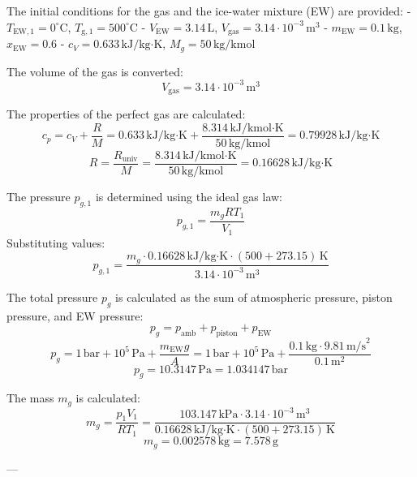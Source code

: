 The initial conditions for the gas and the ice-water mixture (EW) are provided:  
- \( T_{\text{EW},1} = 0^\circ\text{C} \), \( T_{\text{g},1} = 500^\circ\text{C} \)  
- \( V_{\text{EW}} = 3.14 \, \text{L} \), \( V_{\text{gas}} = 3.14 \cdot 10^{-3} \, \text{m}^3 \)  
- \( m_{\text{EW}} = 0.1 \, \text{kg} \), \( x_{\text{EW}} = 0.6 \)  
- \( c_V = 0.633 \, \text{kJ/kg·K} \), \( M_g = 50 \, \text{kg/kmol} \)  

The volume of the gas is converted:  
\[
V_{\text{gas}} = 3.14 \cdot 10^{-3} \, \text{m}^3
\]

The properties of the perfect gas are calculated:  
\[
c_p = c_V + \frac{R}{M} = 0.633 \, \text{kJ/kg·K} + \frac{8.314 \, \text{kJ/kmol·K}}{50 \, \text{kg/kmol}} = 0.79928 \, \text{kJ/kg·K}
\]  
\[
R = \frac{R_{\text{univ}}}{M} = \frac{8.314 \, \text{kJ/kmol·K}}{50 \, \text{kg/kmol}} = 0.16628 \, \text{kJ/kg·K}
\]

The pressure \( p_{g,1} \) is determined using the ideal gas law:  
\[
p_{g,1} = \frac{m_g R T_1}{V_1}
\]  
Substituting values:  
\[
p_{g,1} = \frac{m_g \cdot 0.16628 \, \text{kJ/kg·K} \cdot (500 + 273.15) \, \text{K}}{3.14 \cdot 10^{-3} \, \text{m}^3}
\]

The total pressure \( p_g \) is calculated as the sum of atmospheric pressure, piston pressure, and EW pressure:  
\[
p_g = p_{\text{amb}} + p_{\text{piston}} + p_{\text{EW}}
\]  
\[
p_g = 1 \, \text{bar} + 10^5 \, \text{Pa} + \frac{m_{\text{EW}} g}{A} = 1 \, \text{bar} + 10^5 \, \text{Pa} + \frac{0.1 \, \text{kg} \cdot 9.81 \, \text{m/s}^2}{0.1 \, \text{m}^2}
\]  
\[
p_g = 10.3147 \, \text{Pa} = 1.034147 \, \text{bar}
\]

The mass \( m_g \) is calculated:  
\[
m_g = \frac{p_1 V_1}{R T_1} = \frac{103.147 \, \text{kPa} \cdot 3.14 \cdot 10^{-3} \, \text{m}^3}{0.16628 \, \text{kJ/kg·K} \cdot (500 + 273.15) \, \text{K}}
\]  
\[
m_g = 0.002578 \, \text{kg} = 7.578 \, \text{g}
\]

---